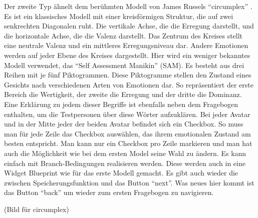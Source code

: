 Der zweite Typ ähnelt dem berühmten Modell von James Russels ``circumplex'' \cite{russel_1980}. Es ist ein klassisches Modell mit einer kreisförmigen Struktur, die auf zwei senkrechten Diagonalen ruht. Die vertikale Achse, die die Erregung darstellt, und die horizontale Achse, die die Valenz darstellt. Das Zentrum des Kreises stellt eine neutrale Valenz und ein mittleres Erregungsniveau dar. Andere Emotionen werden auf jeder Ebene des Kreises dargestellt.  Hier wird ein weniger bekanntes Modell verwendet, das ``Self Assessment Manikin'' (SAM). Es besteht aus drei Reihen mit je fünf Piktogrammen. Diese Piktogramme stellen den Zustand eines Gesichts nach verschiedenen Arten von Emotionen dar. So repräsentiert der erste Bereich die Wertigkeit, der zweite die Erregung und der dritte die Dominanz. Eine Erklärung zu jedem dieser Begriffe ist ebenfalls neben dem Fragebogen enthalten, um die Testpersonen über diese Wörter aufzuklären.  Bei jeder Avatar und in der Mitte jeder der beiden Avatar befindet sich ein Checkbox.  So muss man für jede Zeile das Checkbox auswählen, das ihrem emotionalen Zustand am besten entspricht. Man kann nur ein Checkbox pro Zeile markieren und man hat auch die Möglichkeit wie bei dem ersten Model seine Wahl zu ändern. Es kann einfach mit Branch-Bedingungen realisieren werden.  Diese werden auch in eine Widget Blueprint wie für das erste Modell gemacht. Es gibt auch wieder die zwischen Speicherungsfunktion und das Button ``next''. Was neues hier kommt ist das Button ``back'' um wieder zum ersten Fragebogen zu navigieren. 

(Bild für circumplex) \\